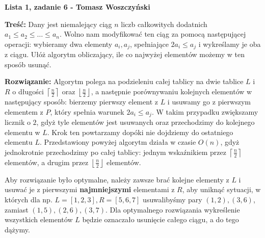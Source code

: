 \documentclass[a4paper,12pt]{article}
\newcommand{\floor}[1]{\left\lfloor #1 \right\rfloor}
\newcommand{\ceil}[1]{\left\lceil #1 \right\rceil}
\begin{document}
\noindent \textbf{Lista 1, zadanie 6 - Tomasz Woszczyński}\newline

\noindent \newline \textbf{Treść:} Dany jest niemalejący ciąg $n$ liczb całkowitych dodatnich $a_1 \leq a_2 \leq \dots \leq a_n$. Wolno nam modyfikować ten ciąg za pomocą następującej operacji: wybieramy dwa elementy $a_i, a_j$, spełniające $2a_i \leq a_j$ i wykreślamy je oba z ciągu. Ułóż algorytm obliczający, ile co najwyżej elementów możemy w ten sposób usunąć.\newline

\noindent \textbf{Rozwiązanie:} Algorytm polega na podzieleniu całej tablicy na dwie tablice $L$ i $R$ o długości $\ceil{\frac{n}{2}}$ oraz $\floor{\frac{n}{2}}$, a następnie porównywaniu kolejnych elementów w następujący sposób: bierzemy pierwszy element z $L$ i usuwamy go z pierwszym elementem z $P$, który spełnia warunek $2a_i \leq a_j$. W takim przypadku zwiększamy licznik o $2$, gdyż tyle elementów jest usuwanych oraz przechodzimy do kolejnego elementu w $L$. Krok ten powtarzamy dopóki nie dojdziemy do ostatniego elementu $L$. Przedstawiony powyżej algorytm działa w czasie $O(n)$, gdyż jednokrotnie przechodzimy po całej tablicy: jednym wskaźnikiem przez $\ceil{\frac{n}{2}}$ elementów, a drugim przez $\floor{\frac{n}{2}}$ elementów. \newline

\noindent Aby rozwiązanie było optymalne, należy zawsze brać kolejne elementy z $L$ i usuwać je z pierwszymi \textbf{najmniejszymi} elementami z $R$, aby uniknąć sytuacji, w których dla np. $L=[1,2,3], R=[5,6,7]$ usuwalibyśmy pary $(1,2), (3,6)$, zamiast $(1,5), (2,6), (3,7)$. Dla optymalnego rozwiązania wykreślenie wszystkich elementów $L$ będzie oznaczało usunięcie całego ciągu, a do tego dążymy. \newline
\end{document}
